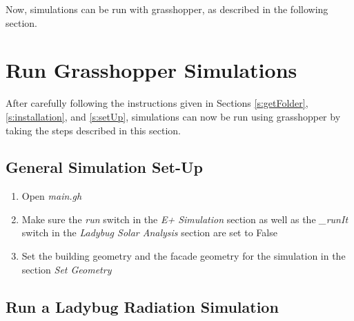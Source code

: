 	Now, simulations can be run with grasshopper, as described in the following section.

\section{Run Grasshopper Simulations}
\label{s:runGH}

	After carefully following the instructions given in Sections \ref{s:getFolder}, \ref{s:installation}, and \ref{s:setUp}, simulations can now be run using grasshopper by taking the steps described in this section.

	\subsection{General Simulation Set-Up}

	\begin{enumerate}

	\item Open \emph{main.gh}

	\item Make sure the \emph{run} switch in the \emph{E+ Simulation} section as well as the \emph{\_runIt} switch in the \emph{Ladybug Solar Analysis} section are set to False 

	\item Set the building geometry and the facade geometry for the simulation in the section \emph{Set Geometry}
	\end{enumerate}

	\subsection{Run a Ladybug Radiation Simulation}

